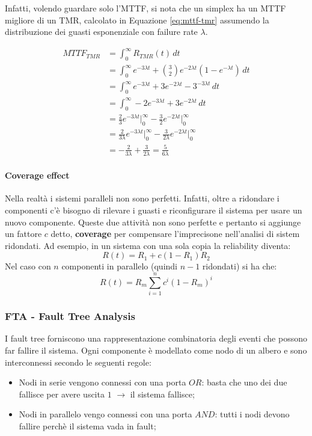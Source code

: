 \documentclass{article}
\begin{document}
Infatti, volendo guardare solo l'MTTF, si nota che un simplex ha un MTTF migliore di un TMR,
calcolato in Equazione \ref{eq:mttf-tmr} assumendo la distribuzione dei guasti esponenziale
con failure rate $\lambda$.

\begin{align}
  MTTF_{TMR} &= \int_0^\infty R_{TMR}(t)\,dt \\ 
  &= \int_0^\infty e^{-3\lambda t} + \binom{3}{2}  e^{-2\lambda t}(1-e^{-\lambda t})\,dt \\ 
  &= \int_0^\infty e^{-3\lambda t} + 3e^{-2\lambda t}-3^{-3\lambda t}\,dt\\
  &= \int_0^\infty -2e^{-3\lambda t} + 3e^{-2\lambda t}\,dt\\
  &= \frac{2}{3}e^{-3\lambda t}\Big|_0^\infty - \frac{3}{2}e^{-2\lambda t}\Big|_0^\infty\\
  &= \frac{2}{3\lambda}e^{-3\lambda t}\Big|_0^\infty - \frac{3}{2\lambda}e^{-2\lambda t}\Big|_0^\infty\\
  &= - \frac{2}{3\lambda} + \frac{3}{2\lambda} = \frac{5}{6\lambda}
  \label{eq:mttf-tmr}
\end{align}

\paragraph{Coverage effect}
Nella realtà i sistemi paralleli non sono perfetti. Infatti, oltre a ridondare i componenti
c'è bisogno di rilevare i guasti e riconfigurare il sistema per usare un nuovo componente. 
Queste due attività non sono perfette e pertanto si aggiunge un fattore $c$ detto, \textbf{
  coverage} per compensare l'imprecisone nell'analisi di sistem ridondati. Ad esempio, in 
un sistema con una sola copia la reliability diventa:
\[
  R(t) = R_1 + c(1-R_1)R_2
\]
Nel caso con $n$ componenti in parallelo (quindi $n-1$ ridondati) si ha che:
\[
  R(t) = R_m \sum_{i=1}^{n}c^i(1-R_m)^i
\]

\subsubsection{FTA - Fault Tree Analysis}
I fault tree forniscono una rappresentazione combinatoria degli eventi che possono far 
fallire il sistema. Ogni componente è modellato come nodo di un albero e sono interconnessi
secondo le seguenti regole:
\begin{itemize}
  \item Nodi in serie vengono connessi con una porta $OR$: basta che uno dei due fallisce 
    per avere uscita $1$ $\rightarrow$ il sistema fallisce;
  \item Nodi in parallelo vengo connessi con una porta $AND$: tutti i nodi devono fallire 
    perchè il sistema vada in fault;
\end{itemize}
\end{document}
